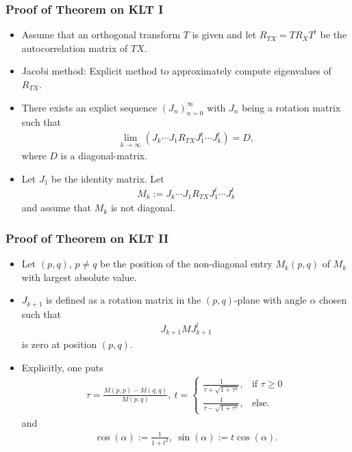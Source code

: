 \begin{frame}\frametitle{Proof of Theorem on KLT I}
\begin{itemize}
\item Assume that an orthogonal transform $T$ is given and let $R_{TX}=TR_XT^{t}$ be the autocorrelation matrix of $TX$.  
\item Jacobi method: Explicit method to approximately compute eigenvalues of $R_{TX}$. 
\item There exists an explict sequence $(J_n)_{n=0}^\infty$ with $J_n$ being a rotation matrix such that 
\begin{align*}
\lim_{k\to\infty}(J_k\cdots J_ 1 R_{TX} J_1^t\cdots J_k^t)=D,
\end{align*}
where $D$ is a diagonal-matrix. 
\item  Let $J_1$ be the identity matrix. Let 
\begin{align*}
M_k:=J_k\cdots J_1 R_{TX}J_1^t\cdots J_k^t 
\end{align*}
and assume that $M_k$ is not diagonal.
\end{itemize}
\end{frame}

\begin{frame}\frametitle{Proof of Theorem on KLT II}
\begin{itemize}
\item Let $(p,q)$, $p\neq q$ be the position of the non-diagonal entry $M_k(p,q)$ of $M_k$ with largest absolute value. 
\item $J_{k+1}$ 
is defined as a rotation matrix  in the $(p,q)$-plane with angle $\alpha$ chosen such that 
\begin{align*}
J_{k+1}MJ_{k+1}^t
\end{align*}
is zero at position $(p,q)$. 
\item Explicitly, one puts
\begin{align*}
\tau=\frac{M(p,p)-M(q,q)}{M(p,q)},\: t=\begin{cases} \frac{1}{\tau+\sqrt{1+\tau^2}}, &\text{if $\tau\geq 0$}\\ \frac{1}{\tau-\sqrt{1+\tau^2}} , &\text{else.} \end{cases}
\end{align*}
and
\begin{align*}
\cos(\alpha):=\frac{1}{1+t^2},\:\sin(\alpha):=t\cos(\alpha).
\end{align*}
\end{itemize}
\end{frame}

